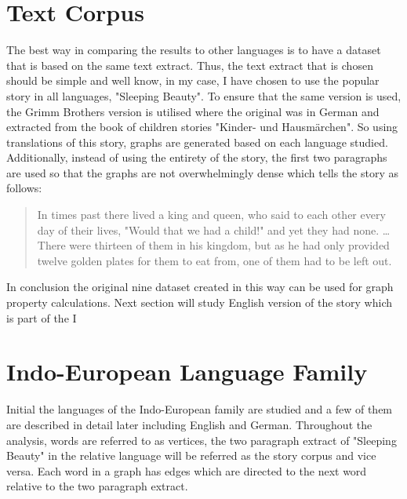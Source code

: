 \section{Text Corpus}
The best way in comparing the results to other languages is to have a dataset that is based on the same text extract. Thus, the text extract that is chosen should be simple and well know, in my case, I have chosen to use the popular story in all languages, "Sleeping Beauty". To ensure that the same version is used, the Grimm Brothers version is utilised where the original was in German and extracted from the book of children stories "Kinder- und Hausmärchen"\cite{grimm1857kinder}. So using translations of this story, graphs are generated based on each language studied.  Additionally, instead of using the entirety of the story, the first two paragraphs are used so that the graphs are not overwhelmingly dense which tells the story as follows:
\begin{quote}
In times past there lived a king and queen, who said to each other every day of their lives, "Would that we had a child!" and yet they had none. \dots There were thirteen of them in his kingdom, but as he had only provided twelve golden plates for them to eat from, one of them had to be left out.
\end{quote}
In conclusion the original nine dataset created in this way can be used for graph property calculations. Next section will study English version of the story which is part of the I

\section{Indo-European Language Family}
Initial the languages of the Indo-European family are studied and a few of them are described in detail later including English and German. Throughout the analysis, words are referred to as vertices, the two paragraph extract of "Sleeping Beauty" in the relative language will be referred as the story corpus and vice versa. Each word in a graph has edges which are directed to the next word relative to the two paragraph extract. 
